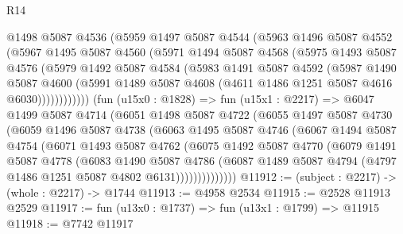 \begin{lexlean}{R14}
\begin{coremodule}
            @1498
            @5087
            @4536
            (@5959
              @1497
              @5087
              @4544
              (@5963
                @1496
                @5087
                @4552
                (@5967
                  @1495
                  @5087
                  @4560
                  (@5971
                    @1494
                    @5087
                    @4568
                    (@5975
                      @1493
                      @5087
                      @4576
                      (@5979
                        @1492
                        @5087
                        @4584
                        (@5983
                          @1491
                          @5087
                          @4592
                          (@5987
                            @1490
                            @5087
                            @4600
                            (@5991
                              @1489
                              @5087
                              @4608
                              (@4611 @1486 @1251 @5087 @4616 @6030))))))))))))
        (fun (u15x0 : @1828) =>
        fun (u15x1 : @2217) =>
        @6047
          @1499
          @5087
          @4714
          (@6051
            @1498
            @5087
            @4722
            (@6055
              @1497
              @5087
              @4730
              (@6059
                @1496
                @5087
                @4738
                (@6063
                  @1495
                  @5087
                  @4746
                  (@6067
                    @1494
                    @5087
                    @4754
                    (@6071
                      @1493
                      @5087
                      @4762
                      (@6075
                        @1492
                        @5087
                        @4770
                        (@6079
                          @1491
                          @5087
                          @4778
                          (@6083
                            @1490
                            @5087
                            @4786
                            (@6087
                              @1489
                              @5087
                              @4794
                              (@4797 @1486 @1251 @5087 @4802 @6131))))))))))))))
@11912 := (subject : @2217) -> (whole : @2217) -> @1744
@11913 := @4958 @2534
@11915 := @2528 @11913 @2529
@11917 := fun (u13x0 : @1737) => fun (u13x1 : @1799) => @11915
@11918 := @7742 @11917

\end{coremodule}
\end{lexlean}

